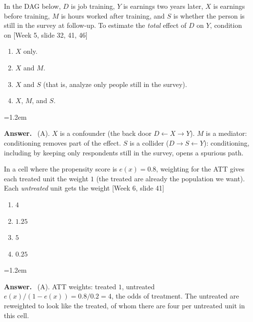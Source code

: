 \documentclass[11pt]{article}
\newenvironment{answer}{\par\smallskip
  \begin{list}{}{\leftmargin=1.2em\rightmargin=0pt}\item[]\color{dukeblue}%
  \textbf{Answer.}\ }{\end{list}\smallskip}
\newcommand{\slideref}[2]{{\footnotesize\color{gray}[Week #1, slide #2]}}
\begin{document}
\begin{enumerate}[leftmargin=*,itemsep=8pt]
\item In the DAG below, $D$ is job training, $Y$ is earnings two years later, $X$ is
      earnings before training, $M$ is hours worked after training, and $S$ is whether the
      person is still in the survey at follow-up. To estimate the \emph{total} effect of $D$
      on $Y$, condition on \slideref{5}{32, 41, 46}
\begin{center}
\end{center}
      \begin{enumerate}[label=(\Alph*),itemsep=0pt]
      \item $X$ only.
      \item $X$ and $M$.
      \item $X$ and $S$ (that is, analyze only people still in the survey).
      \item $X$, $M$, and $S$.
      \end{enumerate}
\begin{answer}
(A). $X$ is a confounder (the back door $D \leftarrow X \to Y$). $M$ is a mediator:
conditioning removes part of the effect. $S$ is a collider ($D \to S \leftarrow Y$):
conditioning, including by keeping only respondents still in the survey, opens a
spurious path.
\end{answer}

\item In a cell where the propensity score is $e(x) = 0.8$, weighting for the ATT gives each
      treated unit the weight $1$ (the treated are already the population we want).
      Each \emph{untreated} unit gets the weight \slideref{6}{41}
      \begin{enumerate}[label=(\Alph*),itemsep=0pt]
      \item $4$
      \item $1.25$
      \item $5$
      \item $0.25$
      \end{enumerate}
\begin{answer}
(A). ATT weights: treated $1$, untreated $e(x)/(1-e(x)) = 0.8/0.2 = 4$, the odds of
treatment. The untreated are reweighted to look like the treated, of whom there are four
per untreated unit in this cell.
\end{answer}


\end{enumerate}
\end{document}
